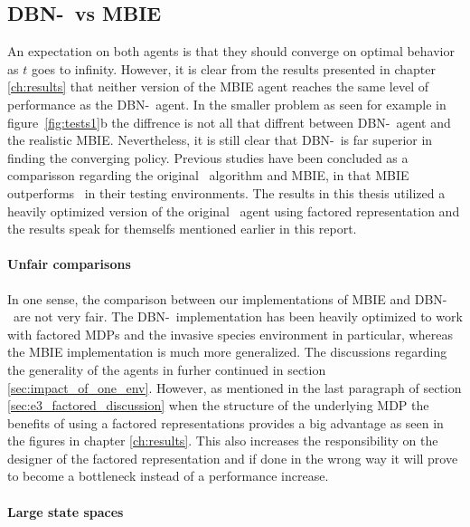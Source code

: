 \subsection{DBN-\etre\ vs MBIE }

An expectation on both agents is that they should converge on optimal behavior
as $t$ goes to infinity. However, it is clear from the results presented in
chapter \ref{ch:results} that neither version of the MBIE agent reaches the
same level of performance as the DBN-\etre\ agent. In the smaller problem as
seen for example in figure~\ref{fig:tests1}b the diffrence is not all that
diffrent between DBN-\etre\ agent and the realistic MBIE. Nevertheless, it is
still clear that DBN-\etre\ is far superior in finding the converging policy.
Previous studies have been concluded as a comparisson regarding the original
\etre\ algorithm and MBIE, in \textcite{strehl2004empirical} that MBIE
outperforms \etre\ in their testing environments. The results in this thesis
utilized a heavily optimized version of the original \etre\ agent using
factored representation and the results speak for themselfs mentioned earlier
in this report. 

\paragraph{Unfair comparisons}

In one sense, the comparison between our implementations of MBIE and DBN-\etre\
are not very fair. The DBN-\etre\ implementation has been heavily optimized to
work with factored MDPs and the invasive species environment in particular,
whereas the MBIE implementation is much more generalized. The discussions
regarding the generality of the agents in furher continued in section
\ref{sec:impact_of_one_env}. However, as mentioned in the last paragraph of
section \ref{sec:e3_factored_discussion} when the structure of the underlying
MDP the benefits of using a factored representations provides a big advantage
as seen in the figures in chapter \ref{ch:results}. This also increases the
responsibility on the designer of the factored representation and if done in
the wrong way it will prove to become a bottleneck instead of a performance
increase.

\paragraph{Large state spaces}

